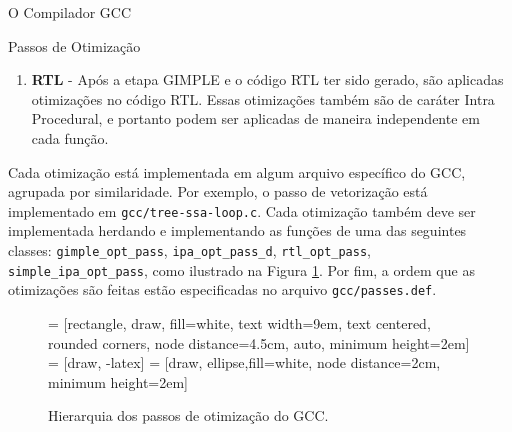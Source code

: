 \begin{section}{O Compilador GCC}
\begin{subsection}{Passos de Otimização}
\begin{enumerate}
        \item \textbf{RTL} - Após a etapa GIMPLE e o código RTL ter sido gerado,
            são aplicadas otimizações no código RTL. Essas otimizações também são
            de caráter Intra Procedural, e portanto podem ser aplicadas de maneira
            independente em cada função.
    \end{enumerate}

    Cada otimização está implementada em algum arquivo específico do GCC,
agrupada por similaridade. Por exemplo, o passo de vetorização está implementado
em \texttt{gcc/tree-ssa-loop.c}. Cada otimização também deve ser implementada
herdando e implementando as funções de uma das seguintes classes:
\texttt{gimple\_opt\_pass}, \texttt{ipa\_opt\_pass\_d}, \texttt{rtl\_opt\_pass},
\texttt{simple\_ipa\_opt\_pass}, como ilustrado na Figura \ref{fig:opt_uml}.
Por fim, a ordem que as otimizações são feitas estão
especificadas no arquivo \texttt{gcc/passes.def}.

\begin{figure}
 = [rectangle, draw, fill=white,
    text width=9em, text centered, rounded corners, node distance=4.5cm, auto, minimum height=2em]
 = [draw, -latex]
 = [draw, ellipse,fill=white, node distance=2cm,
    minimum height=2em]
\begin{center}
\end{center}
\caption{Hierarquia dos passos de otimização do GCC.}
\label{fig:opt_uml}
\end{figure}



\end{subsection}
\end{section}
